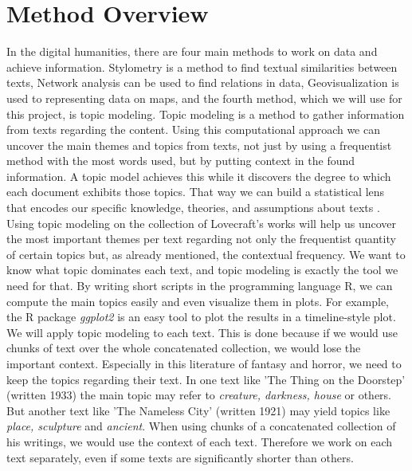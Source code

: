 \section{Method Overview}

In the digital humanities, there are four main methods to work on data and achieve information. 
Stylometry is a method to find textual similarities between texts, Network analysis can be used 
to find relations in data, Geovisualization is used to representing data on maps, and the fourth 
method, which we will use for this project, is topic modeling. Topic modeling is a method to 
gather information from texts regarding the content. Using this computational approach we can 
uncover the main themes and topics from texts, not just by using a frequentist method with the 
most words used, but by putting context in the found information. A topic model achieves this 
while it discovers the degree to which each document exhibits those topics. That way we can 
build a statistical lens that encodes our specific knowledge, theories, and assumptions about 
texts \cite{blei}.\\

Using topic modeling on the collection of Lovecraft's works will help us uncover the most 
important themes per text regarding not only the frequentist quantity of certain topics but, 
as already mentioned, the contextual frequency. We want to know what topic dominates each text, 
and topic modeling is exactly the tool we need for that. By writing short scripts in the 
programming language R, we can compute the main topics easily and even visualize them in plots. 
For example, the R package \textit{ggplot2} is an easy tool to plot the results in a timeline-style plot. \\

We will apply topic modeling to each text. This is done because if we would use chunks of text 
over the whole concatenated collection, we would lose the important context. Especially in this 
literature of fantasy and horror, we need to keep the topics regarding their text. In one text 
like 'The Thing on the Doorstep' (written 1933) the main topic may refer to \textit{creature,
darkness, house} or others. But another text like 'The Nameless City' (written 1921) may 
yield topics like \textit{place, sculpture} and \textit{ancient}. When using chunks of a concatenated 
collection of his writings, we would use the context of each text. Therefore we work on each 
text separately, even if some texts are significantly shorter than others.\\

